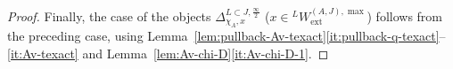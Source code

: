\documentclass[11pt]{amsart}
\numberwithin{equation}{section}
\theoremstyle{plain}
\theoremstyle{definition}
\newcommand{\I}{{\mathrm I}}
\newcommand{\sL}{{\mathcal L}}
\newcommand{\sW}{{\mathcal W}}
\newcommand{\X}{{\mathbb X}}
\newcommand{\Xd}{\check{\X}}
\newcommand{\Hom}{\mathrm{Hom}}
\newcommand{\semi}{{{\frac{\infty}{2}}}}
\newcommand{\quar}{{{\frac{\infty}{4}}}}
\newcommand{\Av}{\mathrm{Av}}
\newcommand{\ex}{\mathrm{ext}}
\newcommand{\Shv}{\mathsf{Shv}}
\newcommand{\Ras}{\mathrm{Ras}}
\newcommand{\Iu}{\mathrm{I}_{\mathrm{u}}}
\newcommand{\comp}{\mathrm{c}}
\begin{document}
\begin{proof}
Finally, the case of the objects $\Delta^{L\subset J,\semi}_{\chi_A,x}$ ($x \in {}^L W_\ex^{(A,J),\max}$) follows from the preceding case, using Lemma~\ref{lem:pullback-Av-texact}\eqref{it:pullback-q-texact}--\eqref{it:Av-texact} and Lemma~\ref{lem:Av-chi-D}\eqref{it:Av-chi-D-1}.
%
%
\end{proof}
\end{document}
